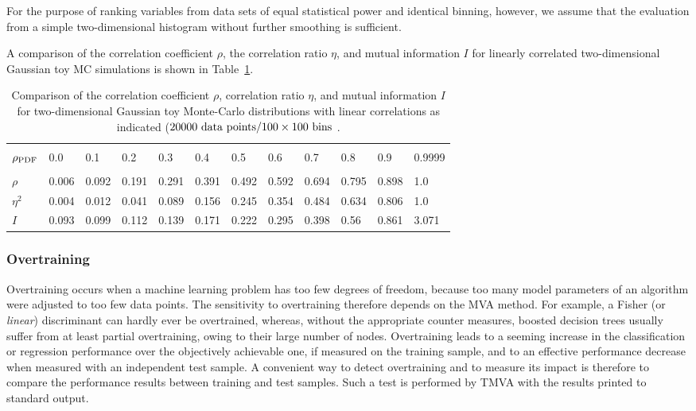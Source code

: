 \begin{itemize}
      For the purpose of ranking variables from data sets of equal
      statistical power and identical binning, however, we assume that
      the evaluation from a simple two-dimensional histogram without
      further smoothing is sufficient.

\end{itemize}
A comparison of the correlation coefficient $\rho$, the correlation
ratio $\eta$, and mutual information $I$ for linearly correlated
two-dimensional Gaussian toy MC simulations is shown in
Table~\ref{tab:compLinToys}.
\begin{table}[t]
\begin{tabularx}{1.0\linewidth}{lXXXXXXXXXXX}
\hline
&&&&&&&&&&&\\[\BD]
$\rho_{\rm PDF}$ & 0.0 & 0.1 & 0.2 & 0.3 & 0.4 & 0.5 & 0.6 & 0.7 & 0.8 & 0.9 & 0.9999\\[\AD]
\hline
&&&&&&&&&&&\\[\BD]
$\rho$ & 0.006& 0.092& 0.191& 0.291& 0.391& 0.492& 0.592& 0.694& 0.795& 0.898& 1.0\\
$\eta^2$& 0.004& 0.012& 0.041& 0.089& 0.156& 0.245& 0.354& 0.484& 0.634& 0.806& 1.0\\
$I$ & 0.093& 0.099& 0.112& 0.139& 0.171& 0.222& 0.295& 0.398& 0.56& 0.861& 3.071\\[\AD]
\hline
\end{tabularx}
\caption{Comparison of the correlation coefficient $\rho$, correlation ratio $\eta$, and 
         mutual information $I$ for two-dimensional Gaussian toy Monte-Carlo distributions 
         with linear correlations as indicated ($20000~{\rm data~points}/100\times100~{\rm bins}$ .}
\label{tab:compLinToys}
\end{table}


\subsubsection{Overtraining}
\label{sec:usingtmva:overtraining}

Overtraining occurs when a machine learning problem has too few
degrees of freedom, because too many model parameters of an algorithm
were adjusted to too few data points. The sensitivity to overtraining
therefore depends on the MVA method.  For example, a Fisher (or {\em
  linear}) discriminant can hardly ever be overtrained, whereas,
without the appropriate counter measures, boosted decision trees
usually suffer from at least partial overtraining, owing to their
large number of nodes.  Overtraining leads to a seeming increase in
the classification or regression performance over the objectively
achievable one, if measured on the training sample, and to an
effective performance decrease when measured with an independent test
sample. A convenient way to detect overtraining and to measure its
impact is therefore to compare the performance results between
training and test samples. Such a test is performed by TMVA with the
results printed to standard output.

